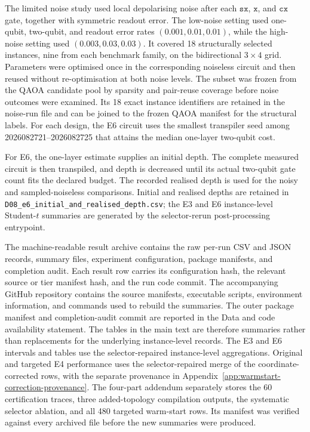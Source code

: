 \documentclass[a4paper,onecolumn,11pt,unpublished]{quantumarticle}
\theoremstyle{remark}
\begin{document}
\label{app:noise-protocol}
The limited noise study used local depolarising noise after each
$\mathtt{sx}$, $\mathtt{x}$, and $\mathtt{cx}$ gate, together with symmetric
readout error.  The low-noise setting used one-qubit, two-qubit, and readout
error rates $(0.001,0.01,0.01)$, while the high-noise setting used
$(0.003,0.03,0.03)$.  It covered 18 structurally selected instances, nine from
each benchmark family, on the bidirectional $3\times4$ grid.  Parameters were
optimised once in the corresponding noiseless circuit and then reused without
re-optimisation at both noise levels.  The subset was frozen from the QAOA
candidate pool by sparsity and pair-reuse coverage before noise outcomes were
examined.  Its 18 exact instance identifiers are retained in the noise-run
file and can be joined to the frozen QAOA manifest for the
structural labels.  For each design, the E6 circuit
uses the smallest transpiler seed among 2026082721--2026082725 that attains the
median one-layer two-qubit cost.

For E6, the one-layer estimate supplies an initial depth. The complete
measured circuit is then transpiled, and depth is decreased until its actual
two-qubit gate count fits the declared budget. The recorded realised depth
is used for the noisy and sampled-noiseless comparisons. Initial and realised
depths are retained in \nolinkurl{D08_e6_initial_and_realised_depth.csv};
the E3 and E6 instance-level Student-$t$ summaries are generated by the
selector-rerun post-processing entrypoint.

The machine-readable result archive contains the raw per-run CSV and JSON
records, summary files, experiment configuration, package manifests, and
completion audit.  Each result row carries its configuration hash, the relevant
source or tier manifest hash, and the run code commit.  The accompanying GitHub
repository contains the source manifests, executable scripts, environment
information, and commands used to rebuild the summaries.  The outer package
manifest and completion-audit commit are reported in the Data and code
availability statement. The tables in the main text are therefore summaries
rather than replacements for the underlying instance-level records. The E3
and E6 intervals and tables use the selector-repaired instance-level
aggregations. Original and targeted E4 performance uses the selector-repaired
merge of the coordinate-corrected rows,
with the separate provenance in
Appendix~\ref{app:warmstart-correction-provenance}. The four-part addendum separately stores the 60
certification traces, three added-topology compilation outputs, the systematic
selector ablation, and all 480 targeted warm-start rows.  Its manifest was
verified against every archived file before the new summaries were produced.
\end{document}
